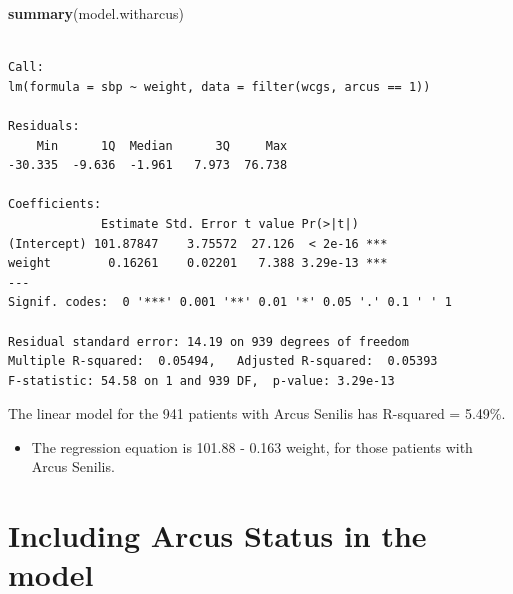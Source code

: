 \documentclass[
]{book}
\newenvironment{Shaded}{\begin{snugshade}}{\end{snugshade}}
\newcommand{\DataTypeTok}[1]{\textcolor[rgb]{0.13,0.29,0.53}{#1}}
\newcommand{\DecValTok}[1]{\textcolor[rgb]{0.00,0.00,0.81}{#1}}
\newcommand{\KeywordTok}[1]{\textcolor[rgb]{0.13,0.29,0.53}{\textbf{#1}}}
\newcommand{\NormalTok}[1]{#1}
\newcommand{\OperatorTok}[1]{\textcolor[rgb]{0.81,0.36,0.00}{\textbf{#1}}}
\newcommand{\StringTok}[1]{\textcolor[rgb]{0.31,0.60,0.02}{#1}}
\providecommand{\tightlist}{%
  \setlength{\itemsep}{0pt}\setlength{\parskip}{0pt}}
\begin{document}
\begin{Shaded}
\begin{Highlighting}[]
\KeywordTok{summary}\NormalTok{(model.witharcus)}
\end{Highlighting}
\end{Shaded}

\begin{verbatim}

Call:
lm(formula = sbp ~ weight, data = filter(wcgs, arcus == 1))

Residuals:
    Min      1Q  Median      3Q     Max 
-30.335  -9.636  -1.961   7.973  76.738 

Coefficients:
             Estimate Std. Error t value Pr(>|t|)    
(Intercept) 101.87847    3.75572  27.126  < 2e-16 ***
weight        0.16261    0.02201   7.388 3.29e-13 ***
---
Signif. codes:  0 '***' 0.001 '**' 0.01 '*' 0.05 '.' 0.1 ' ' 1

Residual standard error: 14.19 on 939 degrees of freedom
Multiple R-squared:  0.05494,	Adjusted R-squared:  0.05393 
F-statistic: 54.58 on 1 and 939 DF,  p-value: 3.29e-13
\end{verbatim}

The linear model for the 941 patients with Arcus Senilis has R-squared = 5.49\%.

\begin{itemize}
\tightlist
\item
  The regression equation is 101.88 - 0.163 weight, for those patients with Arcus Senilis.
\end{itemize}

\hypertarget{including-arcus-status-in-the-model}{%
\section{Including Arcus Status in the model}\label{including-arcus-status-in-the-model}}

\begin{Shaded}
\end{Shaded}
\end{document}
